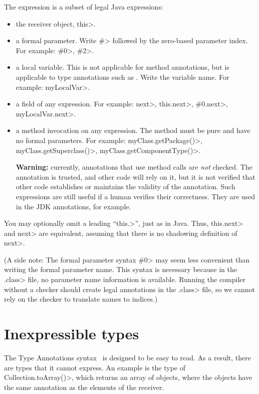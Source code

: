 The expression is a subset of legal Java expressions:

\begin{itemize}
\item
  the receiver object, \<this>.
\item
  a formal parameter.  Write \<\#> followed by the zero-based parameter
  index.  For example: \<\#0>, \<\#2>.
\item
  a local variable.  This is not applicable for method annotations, but is
  applicable to type annotations such as
  .  Write the variable name.  For
  example: \<myLocalVar>.
\item
  a field of any expression.  For example:  \<next>,
  \<this.next>, \<\#0.next>, \<myLocalVar.next>.
\item a method invocation on any expression.
  The method must be pure and have no formal parameters.  For example:
  \<myClass.getPackage()>, \<myClass.getSuperclass()>,
  \<myClass.getComponentType()>.

  \textbf{Warning:}  currently, annotations that use method calls are
  \emph{not} checked.  The annotation is trusted, and other code will rely
  on it, but it is not verified that other code establishes or maintains
  the validity of the annotation.  Such expressions are still useful if a
  human verifies their correctness.  They are used in the JDK annotations,
  for example.
\end{itemize}

You may optionally omit a leading ``\<this.>'', just as in Java.  Thus, 
\<this.next> and \<next> are equivalent, assuming that there is no
shadowing definition of \<next>.

(A side note:  The formal parameter syntax \<\#0> may seem less convenient
than writing the formal parameter name.  This syntax is necessary because
in the \<.class> file, no parameter name information is available.  Running
the compiler without a checker should create legal annotations in the
\<.class> file, so we cannot rely on the checker to translate names to
indices.)


\section{Inexpressible types\label{inexpressible-types}}

The Type Annotations syntax~\cite{jsr308} is designed to be easy to read.  As a result,
there are types that it cannot express.  An example is the type of
\<Collection.toArray()>, which returns an array of objects, where the
objects have the same annotation as the elements of the receiver.

